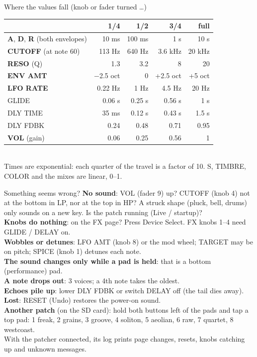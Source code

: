 \documentclass{article}
\newcommand{\FX}[1]{\textcolor{fxc}{#1}}
\begin{document}
\begin{minipage}[t]{112mm}\vspace{0pt}
\begin{card}{Where the values fall (knob or fader turned \dots)}
\fontsize{7.5}{9.2}\selectfont
\setlength{\tabcolsep}{3pt}
\begin{tabular}{@{}l r r r r@{}}
 & 1/4 & 1/2 & 3/4 & full \\ \hline
\textcolor{ampc}{\textbf{A}}, \textcolor{ampc}{\textbf{D}}, \textcolor{ampc}{\textbf{R}} (both envelopes) & 10 ms & 100 ms & 1 s & 10 s \\
\textcolor{fltc}{\textbf{CUTOFF}} (at note 60) & 113 Hz & 640 Hz & 3.6 kHz & 20 kHz \\
\textcolor{fltc}{\textbf{RESO}} (Q) & 1.3 & 3.2 & 8 & 20 \\
\textcolor{modc}{\textbf{ENV AMT}} & \(-\)2.5 oct & 0 & +2.5 oct & +5 oct \\
\textcolor{lfoc}{\textbf{LFO RATE}} & 0.22 Hz & 1 Hz & 4.5 Hz & 20 Hz \\
\FX{GLIDE} & 0.06 s & 0.25 s & 0.56 s & 1 s \\
\FX{DLY TIME} & 35 ms & 0.12 s & 0.43 s & 1.5 s \\
\FX{DLY FDBK} & 0.24 & 0.48 & 0.71 & 0.95 \\
\textbf{VOL} (gain) & 0.06 & 0.25 & 0.56 & 1 \\
\end{tabular}\\[0.5mm]
Times are exponential: each quarter of the travel is a factor of 10. S, TIMBRE, COLOR and the mixes are linear, 0--1.
\end{card}

\begin{card}{Something seems wrong?}
\fontsize{7.5}{9.2}\selectfont
\textbf{No sound}: VOL (fader 9) up? CUTOFF (knob 4) not at the bottom in LP, nor at the top in HP?
A struck shape (pluck, bell, drums) only sounds on a new key. Is the patch running (Live / startup)?\\[0.4mm]
\textbf{Knobs do nothing}: on the FX page? Press Device Select.
FX knobs 1--4 need GLIDE / DELAY on.\\[0.4mm]
\textbf{Wobbles or detunes}: LFO AMT (knob 8) or the mod wheel; TARGET may be on pitch; SPICE (knob 1) detunes each note.\\[0.4mm]
\textbf{The sound changes only while a pad is held}: that is a bottom (performance) pad.\\[0.4mm]
\textbf{A note drops out}: 3 voices; a 4th note takes the oldest.\\[0.4mm]
\textbf{Echoes pile up}: lower DLY FDBK or switch DELAY off (the tail dies away).\\[0.4mm]
\textbf{Lost}: RESET (Undo) restores the power-on sound.\\[0.4mm]
\textbf{Another patch} (on the SD card): hold both buttons left of the pads and tap a top pad: 1 freak, 2 grains, 3 groove, 4 soliton, 5 aeolian, 6 raw, 7 quartet, 8 westcoast.\\[0.4mm]
{\color{black!60}With the patcher connected, its log prints page changes, resets, knobs catching up and unknown messages.}
\end{card}


\end{minipage}
\end{document}
